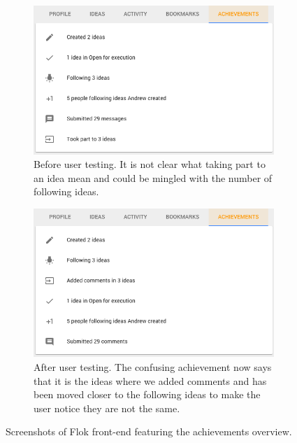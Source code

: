 \documentclass[a4paper,12pt,twoside]{article}
\begin{document}
\begin{figure}[!htb]
    \begin{subfigure}[t]{.495\textwidth}
        \includegraphics[width=\textwidth]{images/user_tests/achievements_before.png}
        \caption{Before user testing. It is not clear what taking part to an idea mean and could be mingled with the number of following ideas.}
        \label{fig.tests.achievements.before}
    \end{subfigure}
    \hfill
    \begin{subfigure}[t]{.495\textwidth}
        \includegraphics[width=\textwidth]{images/user_tests/achievements_after.png}
        \caption{After user testing. The confusing achievement now says that it is the ideas where we added comments and has been moved closer to the following ideas to make the user notice they are not the same.}
        \label{fig.tests.achievements.after}
    \end{subfigure}
    \caption{Screenshots of Flok front-end featuring the achievements overview.}
    \label{fig.tests.achievements}
\end{figure}
\end{document}
